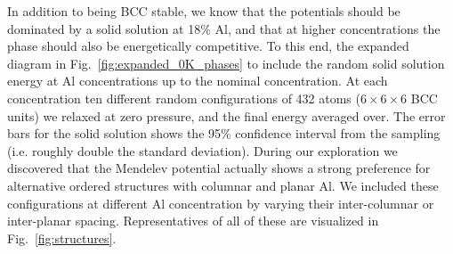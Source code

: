 In addition to being BCC stable, we know that the potentials should be dominated by a solid solution at 18\% Al, and that at higher concentrations the \DOTHREE phase should also be energetically competitive.
To this end, the expanded diagram in Fig.~\ref{fig:expanded_0K_phases} to include the random solid solution energy at Al concentrations up to the nominal \DOTHREE concentration.
At each concentration ten different random configurations of 432 atoms ($6\times6\times6$ BCC units) we relaxed at zero pressure, and the final energy averaged over.
The error bars for the solid solution shows the 95\% confidence interval from the sampling (i.e. roughly double the standard deviation).
During our exploration we discovered that the Mendelev potential actually shows a strong preference for alternative ordered structures with columnar and planar Al.
We included these configurations at different Al concentration by varying their inter-columnar or inter-planar spacing.
Representatives of all of these are visualized in Fig.~\ref{fig:structures}.
%
